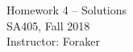 \documentclass[10pt]{article}
\begin{document}
\begin{center}
  {\sc Homework 4 -- Solutions}\\
  {\sc SA405, Fall 2018} \\
  {\sc Instructor: Foraker}
\end{center}

\medskip

\begin{enumerate} 
 






\end{enumerate}
\end{document}
